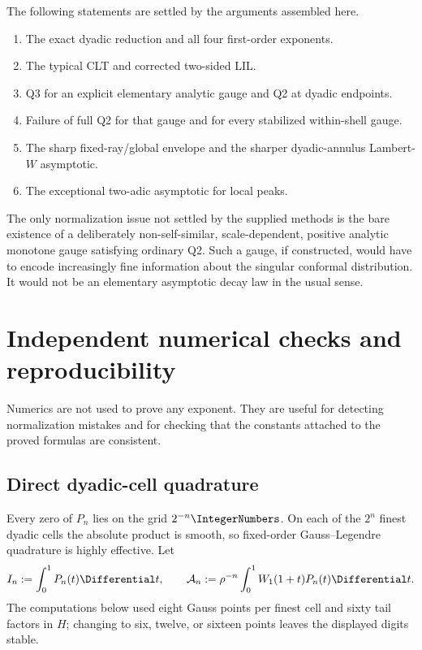 \documentclass[11pt,oneside]{article}
\theoremstyle{definition}
\theoremstyle{remark}
\begin{document}
The following statements are settled by the arguments assembled here.
\begin{enumerate}
 \item The exact dyadic reduction and all four first-order exponents.
 \item The typical CLT and corrected two-sided LIL.
 \item Q3 for an explicit elementary analytic gauge and Q2 at dyadic endpoints.
 \item Failure of full Q2 for that gauge and for every stabilized within-shell
 gauge.
 \item The sharp fixed-ray/global envelope and the sharper dyadic-annulus
 Lambert-$W$ asymptotic.
 \item The exceptional two-adic asymptotic for local peaks.
\end{enumerate}
The only normalization issue not settled by the supplied methods is the bare
existence of a deliberately non-self-similar, scale-dependent, positive
analytic monotone gauge satisfying ordinary Q2.  Such a gauge, if constructed,
would have to encode increasingly fine information about the singular
conformal distribution.  It would not be an elementary asymptotic decay law
in the usual sense.

\section{Independent numerical checks and reproducibility}
\label{sec:numerics}

Numerics are not used to prove any exponent.  They are useful for detecting
normalization mistakes and for checking that the constants attached to the
proved formulas are consistent.

\subsection{Direct dyadic-cell quadrature}

Every zero of $P_n$ lies on the grid $2^{-n}\IntegerNumbers$.  On each of the $2^n$ finest
dyadic cells the absolute product is smooth, so fixed-order Gauss--Legendre
quadrature is highly effective.  Let
\begin{equation}
 I_n:=\int_0^1P_n(t)\Differential t,
 \qquad
 \mathcal A_n:=\rho^{-n}\int_0^1W_1(1+t)P_n(t)\Differential t.
 \label{eq:numeric-sequences}
\end{equation}
The computations below used eight Gauss points per finest cell and sixty tail
factors in $H$; changing to six, twelve, or sixteen points leaves the displayed
digits stable.
\end{document}
